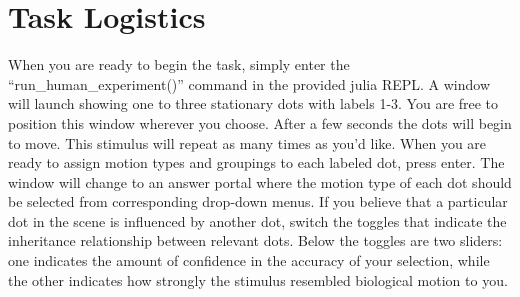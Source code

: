 \documentclass{scrartcl}
\begin{document}
\section{Task Logistics}

When you are ready to begin the task, simply enter the ``run\_human\_experiment()'' command in the provided julia REPL. A window will launch showing one to three stationary dots with labels 1-3. You are free to position this window wherever you choose. After a few seconds the dots will begin to move. This stimulus will repeat as many times as you'd like. When you are ready to assign motion types and groupings to each labeled dot, press enter. The window will change to an answer portal where the motion type of each dot should be selected from corresponding drop-down menus. If you believe that a particular dot in the scene is influenced by another dot, switch the toggles that indicate the inheritance relationship between relevant dots. Below the toggles are two sliders: one indicates the amount of confidence in the accuracy of your selection, while the other indicates how strongly the stimulus resembled biological motion to you.
\end{document}
